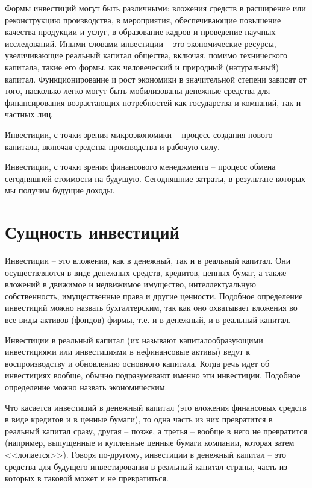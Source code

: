 Формы инвестиций могут быть различными: вложения средств в расширение или
реконструкцию производства, в мероприятия, обеспечивающие повышение качества
продукции и услуг, в образование кадров и проведение научных исследований.
Иными словами инвестиции -- это экономические ресурсы, увеличивающие реальный
капитал общества, включая, помимо технического капитала, такие его формы, как
человеческий и природный (натуральный) капитал. Функционирование и рост
экономики в значительной степени зависят от того, насколько легко могут быть
мобилизованы денежные средства для финансирования возрастающих потребностей как
государства и компаний, так и частных лиц.

Инвестиции, с точки зрения микроэкономики -- процесс создания нового капитала,
включая средства производства и рабочую силу.

Инвестиции, с точки зрения финансового менеджмента -- процесс обмена
сегодняшней стоимости на будущую. Сегодняшние затраты, в результате которых мы
получим будущие доходы.

\vspace*{2em}
\section{Сущность инвестиций}

Инвестиции -- это вложения, как в денежный, так и в реальный капитал. Они
осуществляются в виде денежных средств, кредитов, ценных бумаг, а также
вложений в движимое и недвижимое имущество, интеллектуальную собственность,
имущественные права и другие ценности. Подобное определение инвестиций можно
назвать бухгалтерским, так как оно охватывает вложения во все виды активов
(фондов) фирмы, т.е. и в денежный, и в реальный капитал.

Инвестиции в реальный капитал (их называют капиталообразующими инвестициями или
инвестициями в нефинансовые активы) ведут к воспроизводству и обновлению
основного капитала. Когда речь идет об инвестициях вообще, обычно подразумевают
именно эти инвестиции. Подобное определение можно назвать экономическим.

Что касается инвестиций в денежный капитал (это вложения финансовых средств в
виде кредитов и в ценные бумаги), то одна часть из них превратится в реальный
капитал сразу, другая -- позже, а третья -- вообще в него не превратится
(например, выпущенные и купленные ценные бумаги компании, которая затем
<<лопается>>). Говоря по-другому, инвестиции в денежный капитал -- это средства
для будущего инвестирования в реальный капитал страны, часть из которых в
таковой может и не превратиться.

